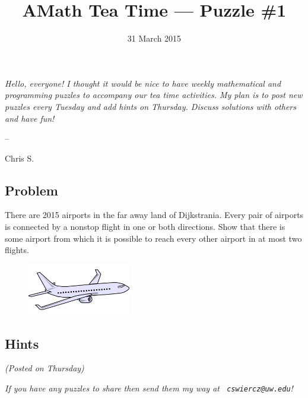 \documentclass[12pt]{article}
\title{AMath Tea Time --- Puzzle \#1}
\author{}
\date{\vspace{-1cm}31 March 2015}
\begin{document}
\maketitle
{}

{\it Hello, everyone! I thought it would be nice to have weekly
  mathematical and programming puzzles to accompany our tea time
  activities. My plan is to post new puzzles every Tuesday and add
  hints on Thursday. Discuss solutions with others and have fun!

  --

  Chris S.}

\subsection*{Problem}

There are 2015 airports in the far away land of Dijkstrania. Every
pair of airports is connected by a nonstop flight in one or both
directions. Show that there is some airport from which it is possible
to reach every other airport in at most two flights.

\begin{figure}[hb]
  \centering
  \includegraphics[width=0.4\textwidth]{airplane.png}
\end{figure}

\subsection*{Hints}

{\it (Posted on Thursday)}


{
\par\vspace*{\fill}
\noindent \small \it
If you have any puzzles to share then send them my way at {\tt
  cswiercz@uw.edu}!
}
\end{document}

